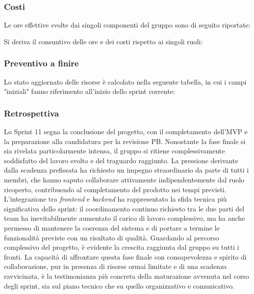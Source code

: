 \documentclass[10pt, letterpaper]{article}
\begin{document}
    \subsubsection{Costi}
    Le ore effettive svolte dai singoli componenti del gruppo sono di seguito riportate:

    \setRuoloFilippo{\Progr}
    \setRuoloChristian{\Resp}
    \setRuoloValeria{\Progr}
    \setRuoloGiuseppe{\Verif}
    \setRuoloFrancesco{\Progr}
    \setRuoloLuca{\Amm}
    \setRuoloLeonardo{\Progr}



    Si deriva il consuntivo delle ore e dei costi rispetto ai singoli ruoli:

    \subsubsection{Preventivo a finire}
    Lo stato aggiornato delle risorse è calcolato nella seguente tabella, in cui i campi "iniziali" fanno riferimento all'inizio dello sprint corrente:


    \subsubsection{Retrospettiva}
Lo Sprint 11 segna la conclusione del progetto, con il completamento dell'MVP e la preparazione alla candidatura per la revisione PB. Nonostante la fase finale si sia rivelata particolarmente intensa, il gruppo si ritiene complessivamente soddisfatto del lavoro svolto e del traguardo raggiunto.
La pressione derivante dalla scadenza prefissata ha richiesto un impegno straordinario da parte di tutti i membri, che hanno saputo collaborare attivamente indipendentemente dal ruolo ricoperto, contribuendo al completamento del prodotto nei tempi previsti. L'integrazione tra \textit{frontend} e \textit{backend} ha rappresentato la sfida tecnica più significativa dello sprint: il coordinamento continuo richiesto tra le due parti del team ha inevitabilmente aumentato il carico di lavoro complessivo, ma ha anche permesso di mantenere la coerenza del sistema e di portare a termine le funzionalità previste con un risultato di qualità.
Guardando al percorso complessivo del progetto, è evidente la crescita raggiunta dal gruppo su tutti i fronti. La capacità di affrontare questa fase finale con consapevolezza e spirito di collaborazione, pur in presenza di risorse ormai limitate e di una scadenza ravvicinata, è la testimonianza più concreta della maturazione avvenuta nel corso degli sprint, sia sul piano tecnico che su quello organizzativo e comunicativo.
\end{document}
